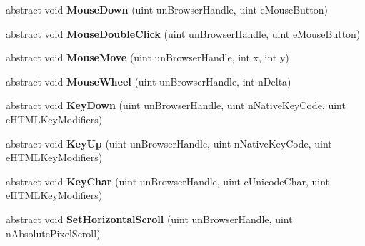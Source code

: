\begin{DoxyCompactItemize}
abstract void {\bfseries Mouse\+Down} (uint un\+Browser\+Handle, uint e\+Mouse\+Button)
\item 
\mbox{\label{class_valve_1_1_steamworks_1_1_i_steam_h_t_m_l_surface_a7d3bcfb76362eb5d27c15452b55b9291}} 
abstract void {\bfseries Mouse\+Double\+Click} (uint un\+Browser\+Handle, uint e\+Mouse\+Button)
\item 
\mbox{\label{class_valve_1_1_steamworks_1_1_i_steam_h_t_m_l_surface_af525ada65b709061e17632034ab1ea39}} 
abstract void {\bfseries Mouse\+Move} (uint un\+Browser\+Handle, int x, int y)
\item 
\mbox{\label{class_valve_1_1_steamworks_1_1_i_steam_h_t_m_l_surface_abda460f745e6c45cb9436b50f6b81ad8}} 
abstract void {\bfseries Mouse\+Wheel} (uint un\+Browser\+Handle, int n\+Delta)
\item 
\mbox{\label{class_valve_1_1_steamworks_1_1_i_steam_h_t_m_l_surface_a402ca64d154cfab6f9c1bba194703e89}} 
abstract void {\bfseries Key\+Down} (uint un\+Browser\+Handle, uint n\+Native\+Key\+Code, uint e\+H\+T\+M\+L\+Key\+Modifiers)
\item 
\mbox{\label{class_valve_1_1_steamworks_1_1_i_steam_h_t_m_l_surface_ae5b77950ebdc7eb0732051a2ef4162d1}} 
abstract void {\bfseries Key\+Up} (uint un\+Browser\+Handle, uint n\+Native\+Key\+Code, uint e\+H\+T\+M\+L\+Key\+Modifiers)
\item 
\mbox{\label{class_valve_1_1_steamworks_1_1_i_steam_h_t_m_l_surface_ad07898c0d28df4f73ccf9d3e6218c6fe}} 
abstract void {\bfseries Key\+Char} (uint un\+Browser\+Handle, uint c\+Unicode\+Char, uint e\+H\+T\+M\+L\+Key\+Modifiers)
\item 
\mbox{\label{class_valve_1_1_steamworks_1_1_i_steam_h_t_m_l_surface_a74dad5030fe838223953a8852e994315}} 
abstract void {\bfseries Set\+Horizontal\+Scroll} (uint un\+Browser\+Handle, uint n\+Absolute\+Pixel\+Scroll)

\end{DoxyCompactItemize}
